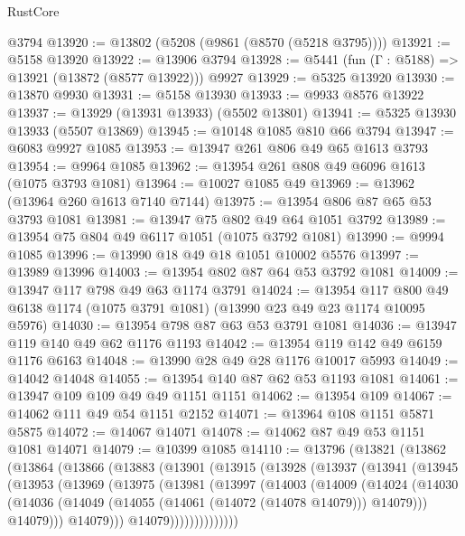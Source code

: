 \begin{lexlean}{RustCore}
\begin{coremodule}
    @3794
@13920 := @13802 (@5208 (@9861 (@8570 (@5218 @3795))))
@13921 := @5158 @13920
@13922 := @13906 @3794
@13928 := @5441 (fun (Γ : @5188) => @13921 (@13872 (@8577 @13922))) @9927
@13929 := @5325 @13920
@13930 := @13870 @9930
@13931 := @5158 @13930
@13933 := @9933 @8576 @13922
@13937 := @13929 (@13931 @13933) (@5502 @13801)
@13941 := @5325 @13930 @13933 (@5507 @13869)
@13945 := @10148 @1085 @810 @66 @3794
@13947 := @6083 @9927 @1085
@13953 := @13947 @261 @806 @49 @65 @1613 @3793
@13954 := @9964 @1085
@13962 := @13954 @261 @808 @49 @6096 @1613 (@1075 @3793 @1081)
@13964 := @10027 @1085 @49
@13969 := @13962 (@13964 @260 @1613 @7140 @7144)
@13975 := @13954 @806 @87 @65 @53 @3793 @1081
@13981 := @13947 @75 @802 @49 @64 @1051 @3792
@13989 := @13954 @75 @804 @49 @6117 @1051 (@1075 @3792 @1081)
@13990 := @9994 @1085
@13996 := @13990 @18 @49 @18 @1051 @10002 @5576
@13997 := @13989 @13996
@14003 := @13954 @802 @87 @64 @53 @3792 @1081
@14009 := @13947 @117 @798 @49 @63 @1174 @3791
@14024 := @13954
    @117
    @800
    @49
    @6138
    @1174
    (@1075 @3791 @1081)
    (@13990 @23 @49 @23 @1174 @10095 @5976)
@14030 := @13954 @798 @87 @63 @53 @3791 @1081
@14036 := @13947 @119 @140 @49 @62 @1176 @1193
@14042 := @13954 @119 @142 @49 @6159 @1176 @6163
@14048 := @13990 @28 @49 @28 @1176 @10017 @5993
@14049 := @14042 @14048
@14055 := @13954 @140 @87 @62 @53 @1193 @1081
@14061 := @13947 @109 @109 @49 @49 @1151 @1151
@14062 := @13954 @109
@14067 := @14062 @111 @49 @54 @1151 @2152
@14071 := @13964 @108 @1151 @5871 @5875
@14072 := @14067 @14071
@14078 := @14062 @87 @49 @53 @1151 @1081 @14071
@14079 := @10399 @1085
@14110 := @13796
    (@13821
      (@13862
        (@13864
          (@13866
            (@13883
              (@13901
                (@13915
                  (@13928
                    (@13937
                      (@13941
                        (@13945
                          (@13953
                            (@13969
                              (@13975
                                (@13981
                                  (@13997
                                    (@14003
                                      (@14009
                                        (@14024
                                          (@14030
                                            (@14036
                                              (@14049
                                                (@14055 (@14061 (@14072 (@14078 @14079))) @14079)))
                                            @14079)))
                                      @14079)))
                                @14079))))))))))))))

\end{coremodule}
\end{lexlean}
